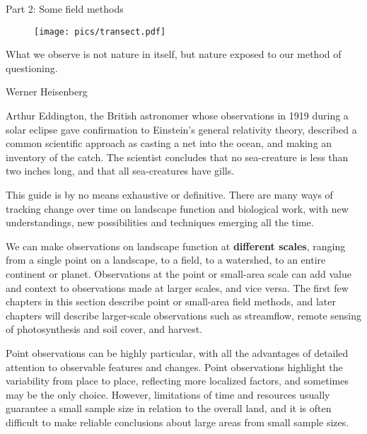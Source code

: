 \documentclass[11pt,letterpaper,twoside,onecolumn]{memoir}
\begin{document}
\pagestyle{myheadings}
\renewcommand{\chaptermark}[1]{\markboth{#1}{}}

\clearpage
\Huge{Part 2: Some field methods}
\normalsize
\thispagestyle{empty}


\vspace*{3 em}
\begin{figure}[h]
\centering
\texttt{[image: pics/transect.pdf]}
\end{figure}
\clearpage

\epigraph{What we observe is not nature in itself, but nature exposed to our method of questioning.}{Werner Heisenberg}

\noindent Arthur Eddington, the British astronomer whose observations in 1919 during a solar eclipse gave confirmation to Einstein's general relativity theory, described a common scientific approach as casting a net into the ocean, and making an inventory of the catch. The scientist concludes that no sea-creature is less than two inches long, and that all sea-creatures have gills.

This guide is by no means exhaustive or definitive. There are many ways of tracking change over time on landscape function and biological work, with new understandings, new possibilities and techniques emerging all the time.

We can make observations on landscape function at \textbf{different scales}, ranging from a single point on a landscape, to a field, to a watershed, to an entire continent or planet. Observations at the point or small-area scale can add value and context to observations made at larger scales, and vice versa. The first few chapters in this section describe point or small-area field methods, and later chapters will describe larger-scale observations such as streamflow, remote sensing of photosynthesis and soil cover, and harvest.

Point observations can be highly particular, with all the advantages of detailed attention to observable features and changes. Point observations highlight the variability from place to place, reflecting more localized factors, and sometimes may be the only choice. However, limitations of time and resources usually guarantee a small sample size in relation to the overall land, and it is often difficult to make reliable conclusions about large areas from small sample sizes. 
\end{document}
